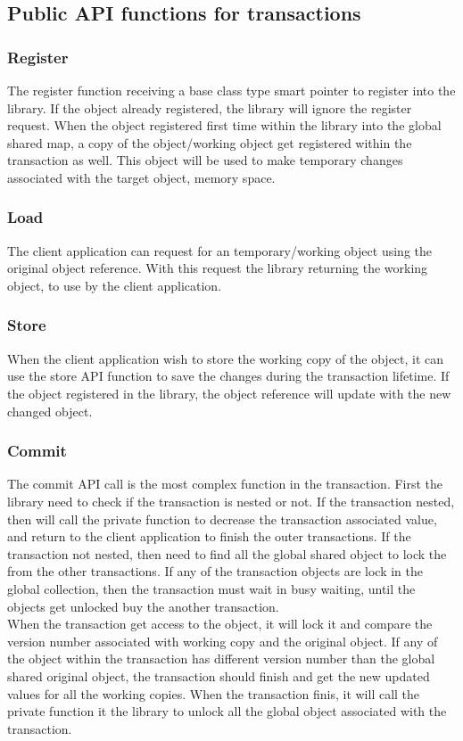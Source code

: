 \documentclass[12pt]{article}
\begin{document}
\subsection{Public API functions for transactions}
\subsubsection{Register}
The register function receiving a base class type smart pointer to register into the library. If the object already registered, the library will ignore the register request. When the object registered first time within the library into the global shared map, a copy of the object/working object get registered within the transaction as well. This object will be used to make temporary changes associated with the target object, memory space. 
\subsubsection{Load}
The client application can request for an temporary/working object using the original object reference. With this request the library returning the working object, to use by the client application.
\subsubsection{Store}
When the client application wish to store the working copy of the object, it can use the store API function to save the changes during the transaction lifetime. If the object registered in the library, the object reference will update with the new changed object. 
\subsubsection{Commit}
The commit API call is the most complex function in the transaction. First the library need to check if the transaction is nested or not. If the transaction nested, then will call the private function to decrease the transaction associated value, and return to the client application to finish the outer transactions. If the transaction not nested, then need to find all the global shared object to lock the from the other transactions. If any of the transaction objects are lock in the global collection, then the transaction must wait in busy waiting, until the objects get unlocked buy the another transaction.\\

When the transaction get access to the object, it will lock it and compare the version number associated with working copy and the original object. If any of the object within the transaction has different version number than the global shared original object, the transaction should finish and get the new updated values for all the working copies. When the transaction finis, it will call the private function it the library to unlock all the global object associated with the transaction.\\
\end{document}
